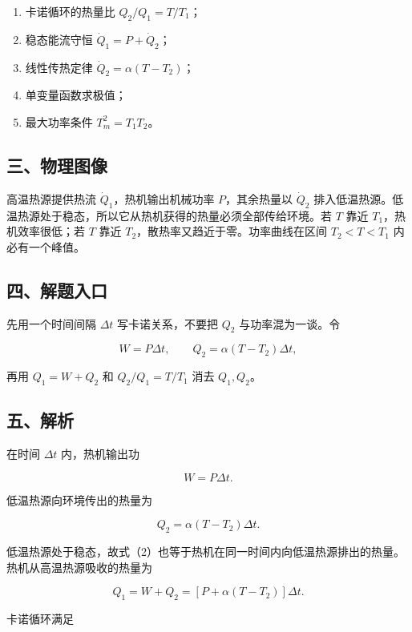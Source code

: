 \documentclass[12pt,a4paper,UTF8]{ctexart}
\newcommand{\tightlist}{\setlength{\itemsep}{0pt}\setlength{\parskip}{0pt}}
\begin{document}
\begin{enumerate}
\def\labelenumi{\arabic{enumi}.}
\tightlist
\item
  卡诺循环的热量比 \(Q_2/Q_1=T/T_1\)；
\item
  稳态能流守恒 \(\dot Q_1=P+\dot Q_2\)；
\item
  线性传热定律 \(\dot Q_2=\alpha(T-T_2)\)；
\item
  单变量函数求极值；
\item
  最大功率条件 \(T_m^2=T_1T_2\)。
\end{enumerate}

\subsection{三、物理图像}\label{ux4e09ux7269ux7406ux56feux50cf-2}

高温热源提供热流 \(\dot Q_1\)，热机输出机械功率 \(P\)，其余热量以
\(\dot Q_2\)
排入低温热源。低温热源处于稳态，所以它从热机获得的热量必须全部传给环境。若
\(T\) 靠近 \(T_1\)，热机效率很低；若 \(T\) 靠近
\(T_2\)，散热率又趋近于零。功率曲线在区间 \(T_2<T<T_1\) 内必有一个峰值。

\subsection{四、解题入口}\label{ux56dbux89e3ux9898ux5165ux53e3-2}

先用一个时间间隔 \(\Delta t\) 写卡诺关系，不要把 \(Q_2\)
与功率混为一谈。令

\[
W=P\Delta t,
\qquad
Q_2=\alpha(T-T_2)\Delta t,
\]

再用 \(Q_1=W+Q_2\) 和 \(Q_2/Q_1=T/T_1\) 消去 \(Q_1,Q_2\)。

\subsection{五、解析}\label{ux4e94ux89e3ux6790-2}

在时间 \(\Delta t\) 内，热机输出功

\[
W=P\Delta t. \tag{1}
\]

低温热源向环境传出的热量为

\[
Q_2=\alpha(T-T_2)\Delta t. \tag{2}
\]

低温热源处于稳态，故式（2）也等于热机在同一时间内向低温热源排出的热量。热机从高温热源吸收的热量为

\[
Q_1=W+Q_2
=\left[P+\alpha(T-T_2)\right]\Delta t. \tag{3}
\]

卡诺循环满足
\end{document}
